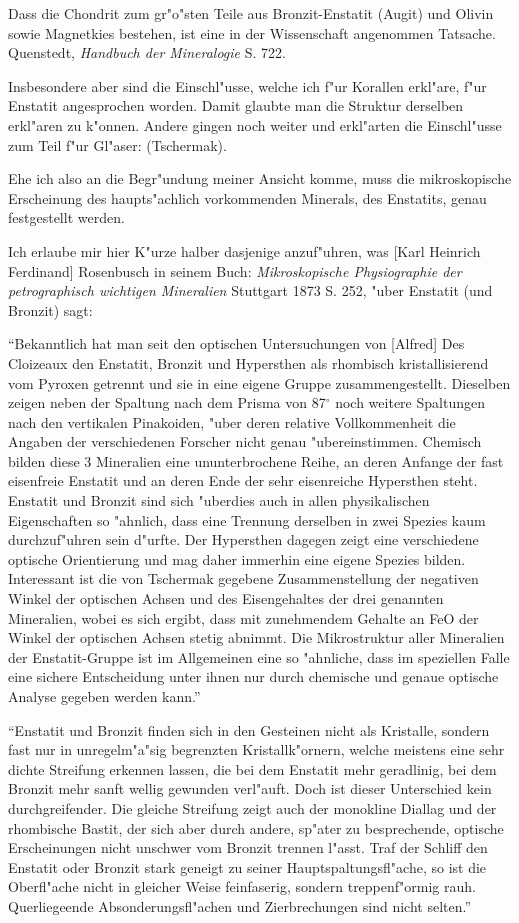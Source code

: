 \documentclass[a4paper, 11pt, oneside]{article}
\begin{document}
Dass die Chondrit zum gr"o"sten Teile aus Bronzit-Enstatit (Augit) und Olivin sowie Magnetkies bestehen, ist eine in der Wissenschaft angenommen Tatsache. Quenstedt, \emph{Handbuch der Mineralogie} S. 722.

Insbesondere aber sind die Einschl"usse, welche ich f"ur Korallen erkl"are, f"ur Enstatit angesprochen worden. Damit glaubte man die Struktur derselben erkl"aren zu k"onnen. Andere gingen noch weiter und erkl"arten die Einschl"usse zum Teil f"ur Gl"aser: (Tschermak).

Ehe ich also an die Begr"undung meiner Ansicht komme, muss die mikroskopische Erscheinung des haupts"achlich vorkommenden Minerals, des Enstatits, genau festgestellt werden.

Ich erlaube mir hier K"urze halber dasjenige anzuf"uhren, was [Karl Heinrich Ferdinand] Rosenbusch in seinem Buch: \emph{Mikroskopische Physiographie der petrographisch wichtigen Mineralien} Stuttgart 1873 S. 252, "uber Enstatit (und Bronzit) sagt:

"`Bekanntlich hat man seit den optischen Untersuchungen von [Alfred] Des Cloizeaux den Enstatit, Bronzit und Hypersthen als rhombisch kristallisierend vom Pyroxen getrennt und sie in eine eigene Gruppe zusammengestellt. Dieselben zeigen neben der Spaltung nach dem Prisma von 87$^{\circ}$ noch weitere Spaltungen nach den vertikalen Pinakoiden, "uber deren relative Vollkommenheit die Angaben der verschiedenen Forscher nicht genau "ubereinstimmen. Chemisch bilden diese 3 Mineralien eine ununterbrochene Reihe, an deren Anfange der fast eisenfreie Enstatit und an deren Ende der sehr eisenreiche Hypersthen steht. Enstatit und Bronzit sind sich "uberdies auch in allen physikalischen Eigenschaften so "ahnlich, dass eine Trennung derselben in zwei Spezies kaum durchzuf"uhren sein d"urfte. Der Hypersthen dagegen zeigt eine verschiedene optische Orientierung und mag daher immerhin eine eigene Spezies bilden. Interessant ist die von Tschermak gegebene Zusammenstellung der negativen Winkel der optischen Achsen und des Eisengehaltes der drei genannten Mineralien, wobei es sich ergibt, dass mit zunehmendem Gehalte an FeO der Winkel der optischen Achsen stetig abnimmt. Die Mikrostruktur aller Mineralien der Enstatit-Gruppe ist im Allgemeinen eine so "ahnliche, dass im speziellen Falle eine sichere Entscheidung unter ihnen nur durch chemische und genaue optische Analyse gegeben werden kann."'

"`Enstatit und Bronzit finden sich in den Gesteinen nicht als Kristalle, sondern fast nur in unregelm"a"sig begrenzten Kristallk"ornern, welche meistens eine sehr dichte Streifung erkennen lassen, die bei dem Enstatit mehr geradlinig, bei dem Bronzit mehr sanft wellig gewunden verl"auft. Doch ist dieser Unterschied kein durchgreifender. Die gleiche Streifung zeigt auch der monokline Diallag und der rhombische Bastit, der sich aber durch andere, sp"ater zu besprechende, optische Erscheinungen nicht unschwer vom Bronzit trennen l"asst. Traf der Schliff den Enstatit oder Bronzit stark geneigt zu seiner Hauptspaltungsfl"ache, so ist die Oberfl"ache nicht in gleicher Weise feinfaserig, sondern treppenf"ormig rauh. Querliegeende Absonderungsfl"achen und Zierbrechungen sind nicht selten."'
\end{document}
